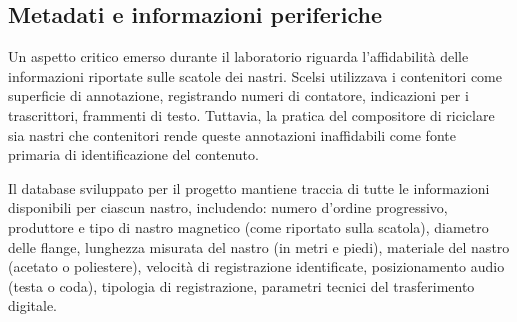 \subsection{Metadati e informazioni periferiche}
Un aspetto critico emerso durante il laboratorio riguarda l'affidabilità delle informazioni riportate sulle scatole dei nastri. Scelsi utilizzava i contenitori come superficie di annotazione, registrando numeri di contatore, indicazioni per i trascrittori, frammenti di testo. Tuttavia, la pratica del compositore di riciclare sia nastri che contenitori rende queste annotazioni inaffidabili come fonte primaria di identificazione del contenuto.

Il database sviluppato per il progetto mantiene traccia di tutte le informazioni disponibili per ciascun nastro, includendo: numero d'ordine progressivo, produttore e tipo di nastro magnetico (come riportato sulla scatola), diametro delle flange, lunghezza misurata del nastro (in metri e piedi), materiale del nastro (acetato o poliestere), velocità di registrazione identificate, posizionamento audio (testa o coda), tipologia di registrazione, parametri tecnici del trasferimento digitale.

